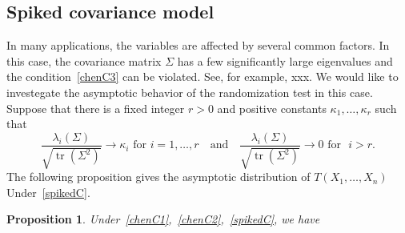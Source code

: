 \documentclass[review]{elsarticle}
\DeclareMathOperator{\mytr}{tr}
\theoremstyle{plain}
\newtheorem{proposition}{\quad\quad Proposition}
\theoremstyle{definition}
\theoremstyle{remark}
\begin{document}
\subsection{Spiked covariance model}
In many applications, the variables are affected by several common factors.
In this case, the covariance matrix $\Sigma$ has a few significantly large eigenvalues and the condition~\eqref{chenC3} can be violated.
See, for example, xxx.
We would like to investegate the asymptotic behavior of the randomization test in this case.
Suppose that there is a fixed integer $r>0$ and positive constants $\kappa_1,\ldots,\kappa_r$ such that
\begin{equation}\label{spikedC}
    \frac{\lambda_{i}(\Sigma)}{\sqrt{\mytr(\Sigma^2)}}\to \kappa_i \text{ for } i=1,\ldots, r
    \quad
    \text{and}
    \quad
    \frac{\lambda_{i}(\Sigma)}{\sqrt{\mytr(\Sigma^2)}}\to 0 \text{ for }\,\, i> r.
\end{equation}
The following proposition gives the asymptotic distribution of $T(X_1,\ldots,X_n)$ Under~\eqref{spikedC}.
\begin{proposition}\label{prop:spiked1}
    Under~\eqref{chenC1},~\eqref{chenC2},~\eqref{spikedC},
    we have
\end{proposition}
\end{document}
